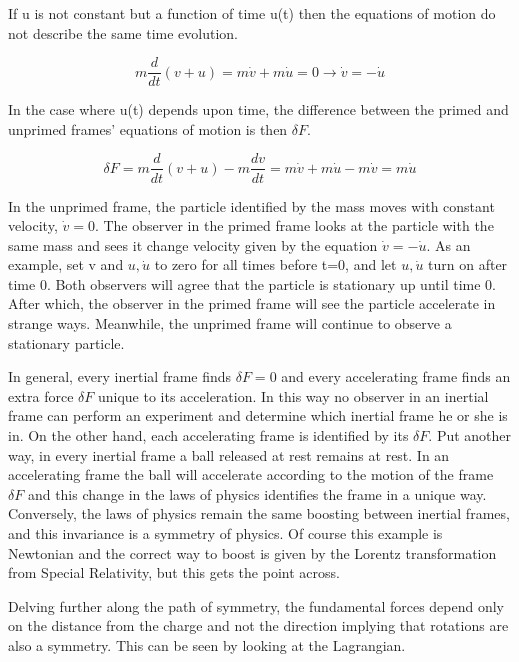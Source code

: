 If u is not constant but a function of time u(t) then the equations of motion do not describe the same time evolution.

\begin{equation}
m\frac{d}{dt}(v+u) = m\dot{v} + m\dot{u} = 0 \rightarrow \dot{v} = -\dot{u}
\end{equation}

In the case where u(t) depends upon time, the difference between the primed and unprimed frames' equations of motion is then $\delta F$.

\begin{equation}
\delta F = m\frac{d}{dt}(v+u) - m\frac{dv}{dt} = m\dot{v} + m\dot{u} - m\dot{v} = m\dot{u}
\end{equation}

In the unprimed frame, the particle identified by the mass moves with constant velocity, $\dot{v} = 0$. The observer in the primed frame looks at the particle with the same mass and sees it change velocity given by the equation $\dot{v} = -\dot{u}$. As an example, set v and $u, \dot{u}$ to zero for all times before t=0, and let $u, \dot{u}$ turn on after time 0. Both observers will agree that the particle is stationary up until time 0. After which, the observer in the primed frame will see the particle accelerate in strange ways. Meanwhile, the unprimed frame will continue to observe a stationary particle. 

In general, every inertial frame finds $\delta F = 0$ and every accelerating frame finds an extra force $\delta F$ unique to its acceleration. In this way no observer in an inertial frame can perform an experiment and determine which inertial frame he or she is in. On the other hand, each accelerating frame is identified by its $\delta F$.  Put another way, in every inertial frame a ball released at rest remains at rest. In an accelerating frame the ball will accelerate according to the motion of the frame $\delta F$ and this change in the laws of physics identifies the frame in a unique way. Conversely, the laws of physics remain the same boosting between inertial frames, and this invariance is a symmetry of physics. Of course this example is Newtonian and the correct way to boost is given by the Lorentz transformation from Special Relativity, but this gets the point across.

Delving further along the path of symmetry, the fundamental forces depend only on the distance from the charge and not the direction implying that rotations are also a symmetry. This can be seen by looking at the Lagrangian. 

